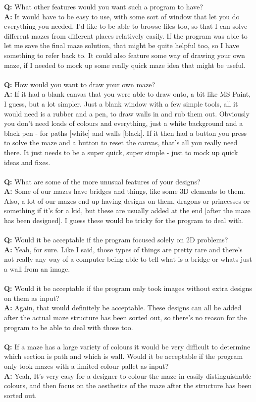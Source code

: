 \documentclass[titlepage]{article}
\begin{document}
\textbf{Q:} What other features would you want such a program to have?
\\
\textbf{A:} It would have to be easy to use, with some sort of window that let you do everything you needed. I'd like to be able to browse files too, so that I can solve different mazes from different places relatively easily. If the program was able to let me save the final maze solution, that might be quite helpful too, so I have something to refer back to. It could also feature some way of drawing your own maze, if I needed to mock up some really quick maze idea that might be useful.
\\\\
\textbf{Q:} How would you want to draw your own maze?
\\
\textbf{A:} If it had a blank canvas that you were able to draw onto, a bit like MS Paint, I guess, but a lot simpler. Just a blank window with a few simple tools, all it would need is a rubber and a pen, to draw walls in and rub them out. Obviously you don't need loads of colours and everything, just a white background and a black pen - for paths [white] and walls [black]. If it then had a button you press to solve the maze and a button to reset the canvas, that's all you really need there. It just needs to be a super quick, super simple - just to mock up quick ideas and fixes.
\\\\
\textbf{Q:} What are some of the more unusual features of your designs?
\\
\textbf{A:} Some of our mazes have bridges and things, like some 3D elements to them. Also, a lot of our mazes end up having designs on them, dragons or princesses or something if it's for a kid, but these are usually added at the end [after the maze has been designed]. I guess these would be tricky for the program to deal with.
\\\\
\textbf{Q:} Would it be acceptable if the program focused solely on 2D problems?
\\
\textbf{A:} Yeah, for sure. Like I said, those types of things are pretty rare and there's not really any way of a computer being able to tell what is a bridge or whats just a wall from an image.
\\\\
\textbf{Q:} Would it be acceptable if the program only took images without extra designs on them as input?
\\
\textbf{A:} Again, that would definitely be acceptable. These designs can all be added after the actual maze structure has been sorted out, so there's no reason for the program to be able to deal with those too.
\\\\
\textbf{Q:} If a maze has a large variety of colours it would be very difficult to determine which section is path and which is wall. Would it be acceptable if the program only took mazes with a limited colour pallet as input?
\\
\textbf{A:} Yeah, It's very easy for a designer to colour the maze in easily distinguishable colours, and then focus on the aesthetics of the maze after the structure has been sorted out. 
\end{document}
